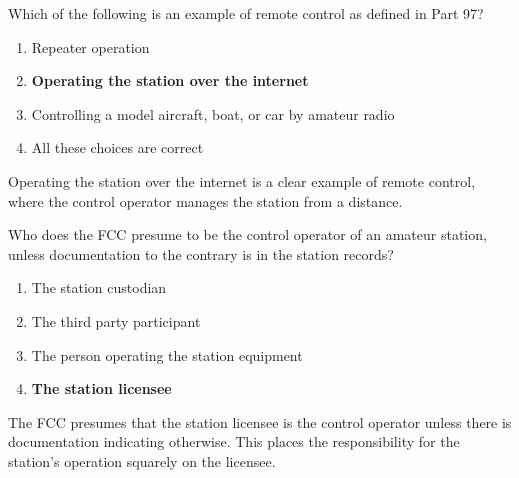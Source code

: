 \begin{tcolorbox}[colback=gray!10!white,colframe=black!75!black,title={T1E10}]
    Which of the following is an example of remote control as defined in Part 97?
    \begin{enumerate}[label=\Alph*),noitemsep]
        \item Repeater operation
        \item \textbf{Operating the station over the internet}
        \item Controlling a model aircraft, boat, or car by amateur radio
        \item All these choices are correct
    \end{enumerate}
\end{tcolorbox}
Operating the station over the internet is a clear example of remote control, where the control operator manages the station from a distance.

\begin{tcolorbox}[colback=gray!10!white,colframe=black!75!black,title={T1E11}]
    Who does the FCC presume to be the control operator of an amateur station, unless documentation to the contrary is in the station records?
    \begin{enumerate}[label=\Alph*),noitemsep]
        \item The station custodian
        \item The third party participant
        \item The person operating the station equipment
        \item \textbf{The station licensee}
    \end{enumerate}
\end{tcolorbox}
The FCC presumes that the station licensee is the control operator unless there is documentation indicating otherwise. This places the responsibility for the station's operation squarely on the licensee.
